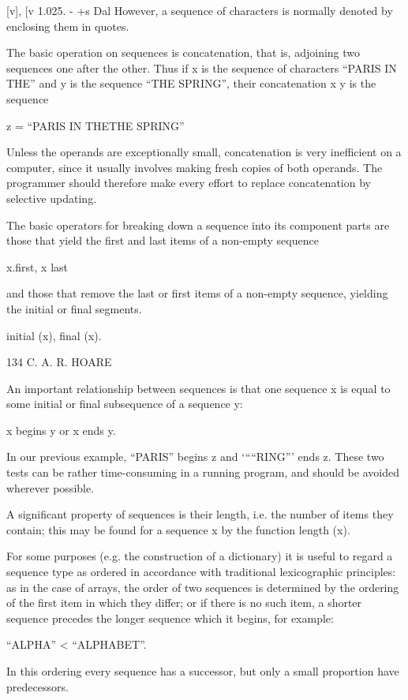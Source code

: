 {{{{				[v], [v 1.025. - +s Dal However, a sequence of characters is normally denoted by enclosing them in quotes.
				
				The basic operation on sequences is concatenation, that is, adjoining two sequences one after the other. Thus if x is the sequence of characters “PARIS IN THE” and y is the sequence “THE SPRING”, their concatenation x y is the sequence
				
				z = “PARIS IN THETHE SPRING”
				
				Unless the operands are exceptionally small, concatenation is very inefficient on a computer, since it usually involves making fresh copies of both operands. The programmer should therefore make every effort to replace concatenation by selective updating.
				
				The basic operators for breaking down a sequence into its component parts are those that yield the first and last items of a non-empty sequence
				
				x.first, x last
				
				and those that remove the last or first items of a non-empty sequence, yielding the initial or final segments.
				
				initial (x), final (x).
				
				134 C. A. R. HOARE
				
				An important relationship between sequences is that one sequence x is equal to some initial or final subsequence of a sequence y:
				
				x begins y or x ends y.
				
				In our previous example, “PARIS” begins z and ‘““RING”’ ends z. These two tests can be rather time-consuming in a running program, and should be avoided wherever possible.
				
				A significant property of sequences is their length, i.e. the number of items they contain; this may be found for a sequence x by the function length (x).
				
				For some purposes (e.g. the construction of a dictionary) it is useful to regard a sequence type as ordered in accordance with traditional lexicographic principles: as in the case of arrays, the order of two sequences is determined by the ordering of the first item in which they differ; or if there is no such item, a shorter sequence precedes the longer sequence which it begins, for example:
				
				“ALPHA” < “ALPHABET”.
				
				In this ordering every sequence has a successor, but only a small proportion have predecessors.
				
}}}}
